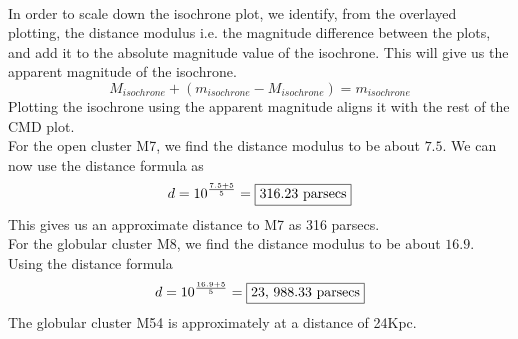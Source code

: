 \documentclass[12pt]{article}
\begin{document}
		\\
		In order to scale down the isochrone plot, we identify, from the overlayed plotting, the distance modulus i.e. the magnitude difference between the plots, and add it to the absolute magnitude value of the isochrone. This will give us the apparent magnitude of the isochrone.\[M_{isochrone} + (m_{isochrone} - M_{isochrone}) = m_{isochrone}\]
		Plotting the isochrone using the apparent magnitude aligns it with the rest of the CMD plot.\\
		For the open cluster M7, we find the distance modulus to be about $7.5$. We can now use the distance formula as
		\[d = 10^{\frac{7.5 + 5}{5}} = \framebox{316.23 parsecs}\]
		This gives us an approximate distance to M7 as 316 parsecs.\\
		For the globular cluster M8, we find the distance modulus to be about $16.9$. Using the distance formula
		\[d = 10^{\frac{16.9 + 5}{5}} = \framebox{23, 988.33 parsecs}\]
		The globular cluster M54 is approximately at a distance of 24Kpc.
\end{document}

